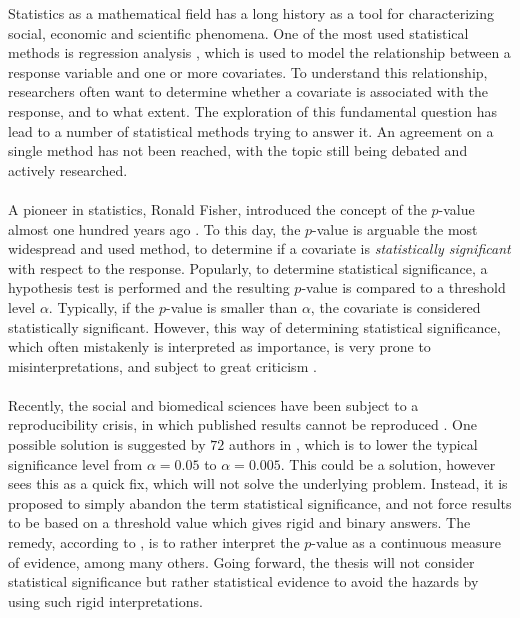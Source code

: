 Statistics as a mathematical field has a long history as a tool for characterizing social, economic and scientific phenomena. One of the most used statistical methods is regression analysis \citep{GLMM_book_old, Ryan_statistical_methods}, which is used to model the relationship between a response variable and one or more covariates. To understand this relationship, researchers often want to determine whether a covariate is associated with the response, and to what extent. The exploration of this fundamental question has lead to a number of statistical methods trying to answer it. An agreement on a single method has not been reached, with the topic still being debated and actively researched. 
\\
\\
A pioneer in statistics, Ronald Fisher, introduced the concept of the $p$-value almost one hundred years ago \citep{Fisher1925}. To this day, the $p$-value is arguable the most widespread and used method, to determine if a covariate is \textit{statistically significant} with respect to the response. Popularly, to determine statistical significance, a hypothesis test is performed and the resulting $p$-value is compared to a threshold level $\alpha$. Typically, if the $p$-value is smaller than $\alpha$, the covariate is considered statistically significant. However, this way of determining statistical significance, which often mistakenly is interpreted as importance, is very prone to misinterpretations, and subject to great criticism \citep{benjamin2018redefine}. 
\\
\\
Recently, the social and biomedical sciences have been subject to a reproducibility crisis, in which published results cannot be reproduced \citep{gelman_crisis}. One possible solution is suggested by $72$ authors in \citet{benjamin2018redefine}, which is to lower the typical significance level from $\alpha=0.05$ to $\alpha=0.005$. This could be a solution, however \citet{gelman_crisis} sees this as a quick fix, which will not solve the underlying problem. Instead, it is proposed to simply abandon the term statistical significance, and not force results to be based on a threshold value which gives rigid and binary answers. The remedy, according to \citet{gelman_crisis}, is to rather interpret the $p$-value as a continuous measure of evidence, among many others. Going forward, the thesis will not consider statistical significance but rather statistical evidence to avoid the hazards by using such rigid interpretations.
\\
